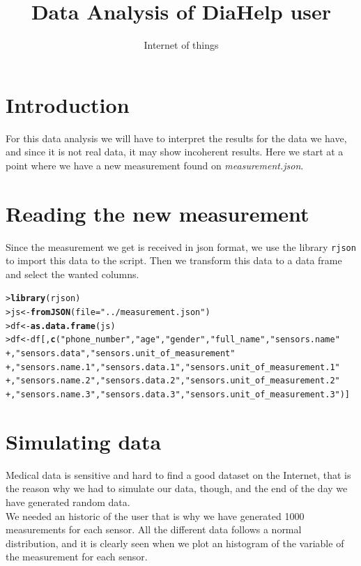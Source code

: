 \documentclass{article}\usepackage[]{graphicx}\usepackage[]{xcolor}
\makeatletter
\newcommand{\hlstr}[1]{\textcolor[rgb]{0.192,0.494,0.8}{#1}}%
\newcommand{\hlstd}[1]{\textcolor[rgb]{0.345,0.345,0.345}{#1}}%
\newcommand{\hlkwb}[1]{\textcolor[rgb]{0.69,0.353,0.396}{#1}}%
\newcommand{\hlkwc}[1]{\textcolor[rgb]{0.333,0.667,0.333}{#1}}%
\newcommand{\hlkwd}[1]{\textcolor[rgb]{0.737,0.353,0.396}{\textbf{#1}}}%
\newenvironment{kframe}{%
 \def\at@end@of@kframe{}%
 \ifinner\ifhmode%
  \def\at@end@of@kframe{\end{minipage}}%
  \begin{minipage}{\columnwidth}%
 \fi\fi%
 \def\FrameCommand##1{\hskip\@totalleftmargin \hskip-\fboxsep
 \colorbox{shadecolor}{##1}\hskip-\fboxsep
     \hskip-\linewidth \hskip-\@totalleftmargin \hskip\columnwidth}%
 \MakeFramed {\advance\hsize-\width
   \@totalleftmargin\z@ \linewidth\hsize
   \@setminipage}}%
 {\par\unskip\endMakeFramed%
 \at@end@of@kframe}
\newenvironment{knitrout}{}{} %
\makeatother
\begin{document}
\title{Data Analysis of DiaHelp user}
\author{Internet of things}
\maketitle
\section{Introduction}
For this data analysis we will have to interpret the results for the data we have, and since it is not real data, it may show incoherent results. Here we start at a point where we have a new measurement found on {\it measurement.json}.

\section{Reading the new measurement}
Since the measurement we get is received in json format, we use the library {\tt rjson} to import this data to the script. Then we transform this data to a data frame and select the wanted columns.
\begin{knitrout}\footnotesize
{}\color{fgcolor}\begin{kframe}
\begin{alltt}
\hlstd{> }\hlkwd{library}\hlstd{(rjson)}
\hlstd{> }\hlstd{js} \hlkwb{<-} \hlkwd{fromJSON}\hlstd{(}\hlkwc{file} \hlstd{=} \hlstr{"../measurement.json"}\hlstd{)}
\hlstd{> }\hlstd{df} \hlkwb{<-} \hlkwd{as.data.frame}\hlstd{(js)}
\hlstd{> }\hlstd{df} \hlkwb{<-} \hlstd{df[,}\hlkwd{c}\hlstd{(}\hlstr{"phone_number"}\hlstd{,} \hlstr{"age"}\hlstd{,} \hlstr{"gender"}\hlstd{,} \hlstr{"full_name"}\hlstd{,} \hlstr{"sensors.name"}
\hlstd{+ }      \hlstd{,}\hlstr{"sensors.data"}\hlstd{,} \hlstr{"sensors.unit_of_measurement"}
\hlstd{+ }      \hlstd{,}\hlstr{"sensors.name.1"}\hlstd{,} \hlstr{"sensors.data.1"}\hlstd{,} \hlstr{"sensors.unit_of_measurement.1"}
\hlstd{+ }      \hlstd{,}\hlstr{"sensors.name.2"}\hlstd{,} \hlstr{"sensors.data.2"}\hlstd{,} \hlstr{"sensors.unit_of_measurement.2"}
\hlstd{+ }      \hlstd{,}\hlstr{"sensors.name.3"}\hlstd{,} \hlstr{"sensors.data.3"}\hlstd{,} \hlstr{"sensors.unit_of_measurement.3"}\hlstd{)]}
\end{alltt}
\end{kframe}
\end{knitrout}

\section{Simulating data}
Medical data is sensitive and hard to find a good dataset on the Internet, that is the reason why we had to simulate our data, though, and the end of the day we have generated random data.
\\We needed an historic of the user that is why we have generated 1000 measurements for each sensor.
All the different data follows a normal distribution, and it is clearly seen when we plot an histogram of the variable of the measurement for each sensor.
\end{document}
